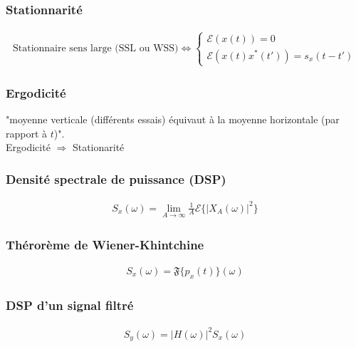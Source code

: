 \documentclass[a4paper]{amsart}
\begin{document}
\subsubsection{Stationnarité}
\begin{eqnarray}
	\text{Stationnaire sens large (SSL ou WSS)}
	\Leftrightarrow
	\begin{cases}
		\mathcal{E}(x(t))=0\\
		\mathcal{E}(x(t)x^*(t'))=s_x(t-t')		
	\end{cases}
\end{eqnarray}

\subsubsection{Ergodicité}
"moyenne verticale (différents essais) équivaut à la moyenne horizontale (par rapport à $t$)". \\
Ergodicité $\Rightarrow$ Stationarité

\subsubsection{Densité spectrale de puissance (DSP)}
\begin{eqnarray}
	S_x(\omega)=\lim_{A\rightarrow\infty}\frac{1}{A}\mathcal{E}\{|X_A(\omega)|^2\}
\end{eqnarray}

\subsubsection{Thérorème de Wiener-Khintchine}
\begin{eqnarray}
	S_x(\omega)=\mathfrak{F}\{p_x(t)\}(\omega)
\end{eqnarray}

\subsubsection{DSP d'un signal filtré}
\begin{eqnarray}
	S_y(\omega)=|H(\omega)|^2S_x(\omega)
\end{eqnarray}
\end{document}
